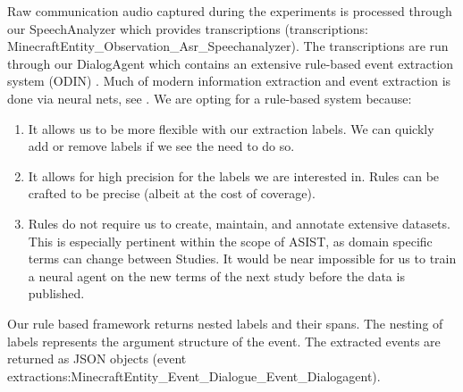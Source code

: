 
Raw communication audio captured during the experiments is processed through our SpeechAnalyzer which provides transcriptions (transcriptions: MinecraftEntity_Observation_Asr_Speechanalyzer). The transcriptions are run through our DialogAgent which contains an extensive rule-based event extraction system (ODIN) \citep{valenzuela-escarcega-etal-2016-odins}. Much of modern information extraction and event extraction is done via neural nets, see \citet{Ahmad2021GATEGA,Du2020EventEB}. We are opting for a rule-based system because:
\begin{enumerate}
 \item It allows us to be more flexible with our extraction labels. We can quickly add or remove labels if we see the need to do so.
 \item It allows for high precision for the labels we are interested in. Rules can be crafted to be precise (albeit at the cost of coverage).
 \item Rules do not require us to create, maintain, and annotate extensive datasets. This is especially pertinent within the scope of ASIST, as domain specific terms can change between Studies. It would be near impossible for us to train a neural agent on the new terms of the next study before the data is published.
\end{enumerate}

Our rule based framework returns nested labels and their spans. The nesting of labels represents the argument structure of the event. The extracted events are returned as JSON objects (event extractions:MinecraftEntity_Event_Dialogue_Event_Dialogagent). 



